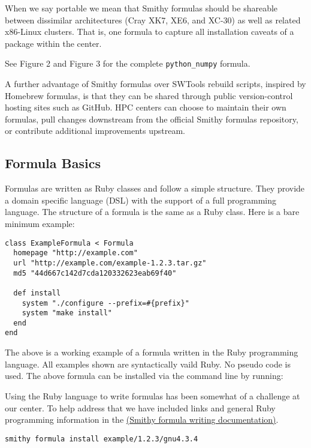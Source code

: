 \documentclass{acm_proc_article-sp}
\begin{document}
When we say portable we mean that Smithy formulas should be shareable between
dissimilar architectures (Cray XK7, XE6, and XC-30) as well as related x86-Linux
clusters. That is, one formula to capture all installation caveats of a package
within the center.

See Figure 2 and Figure 3
for the complete \texttt{python\_numpy} formula.

A further advantage of Smithy formulas over SWTools rebuild scripts, inspired by
Homebrew formulas, is that they can be shared through public version-control
hosting sites such as GitHub. HPC centers can choose to maintain their own
formulas, pull changes downstream from the official Smithy formulas repository,
or contribute additional improvements upstream.

\subsection{Formula Basics}

Formulas are written as Ruby classes and follow a simple structure. They
provide a domain specific language (DSL) with the support of a full programming
language. The structure of a formula is the same as a Ruby class. Here is a bare
minimum example:

\begin{quoting}
\begin{verbatim}
class ExampleFormula < Formula
  homepage "http://example.com"
  url "http://example.com/example-1.2.3.tar.gz"
  md5 "44d667c142d7cda120332623eab69f40"

  def install
    system "./configure --prefix=#{prefix}"
    system "make install"
  end
end
\end{verbatim}
\end{quoting}

The above is a working example of a formula written in the Ruby programming
language. All examples shown are syntactically vaild Ruby. No pseudo code is
used. The above formula can be installed via the command line by running:

Using the Ruby language to write formulas has been somewhat of a challenge at
our center. To help address that we have included links and general Ruby
programming information in the
\href{http://anthonydigirolamo.github.io/smithy/smithyformula.5.html#COMMON-OPERATIONS}{(Smithy formula writing documentation)}.

\begin{quoting}
\begin{verbatim}
smithy formula install example/1.2.3/gnu4.3.4
\end{verbatim}
\end{quoting}
\end{document}
